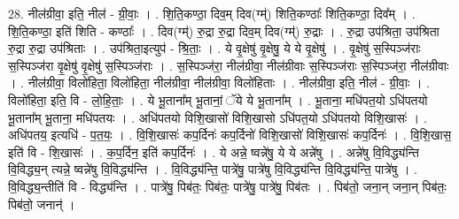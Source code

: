 \documentclass[17pt]{extarticle}
\begin{document}
28. नील॑ग्रीवा॒ इति॒ नील॑ - ग्री॒वाः॒ । . शि॒ति॒कण्ठा॒ दिव॒म् दिव(ग्म्॑) शिति॒कण्ठाः᳚ शिति॒कण्ठा॒ दिव᳚म् । . शि॒ति॒कण्ठा॒ इति॑ शिति - कण्ठाः᳚ । . दिव(ग्म्॑) रु॒द्रा रु॒द्रा दिव॒म् दिव(ग्म्॑) रु॒द्राः । . रु॒द्रा उप॑श्रिता॒ उप॑श्रिता रु॒द्रा रु॒द्रा उप॑श्रिताः । . उप॑श्रिता॒इत्युप॑ - श्रि॒ताः॒ । . ये वृ॒क्षेषु॑ वृ॒क्षेषु॒ ये ये वृ॒क्षेषु॑ । . वृ॒क्षेषु॑ स॒स्पिञ्ज॑राः स॒स्पिञ्ज॑रा वृ॒क्षेषु॑ वृ॒क्षेषु॑ स॒स्पिञ्ज॑राः । . स॒स्पिञ्ज॑रा॒ नील॑ग्रीवा॒ नील॑ग्रीवाः स॒स्पिञ्ज॑राः स॒स्पिञ्ज॑रा॒ नील॑ग्रीवाः । . नील॑ग्रीवा॒ विलो॑हिता॒ विलो॑हिता॒ नील॑ग्रीवा॒ नील॑ग्रीवा॒ विलो॑हिताः । . नील॑ग्रीवा॒ इति॒ नील॑ - ग्री॒वाः॒ । . विलो॑हिता॒ इति॒ वि - लो॒हि॒ताः॒ । . ये भू॒ताना᳚म् भू॒तानां॒ ॅये ये भू॒ताना᳚म् । . भू॒ताना॒ मधि॑पत॒यो ऽधि॑पतयो भू॒ताना᳚म् भू॒ताना॒ मधि॑पतयः । . अधि॑पतयो विशि॒खासो॑ विशि॒खासो ऽधि॑पत॒यो ऽधि॑पतयो विशि॒खासः॑ । . अधि॑पतय॒ इत्यधि॑ - प॒त॒यः॒ । . वि॒शि॒खासः॑ कप॒र्दिनः॑ कप॒र्दिनो॑ विशि॒खासो॑ विशि॒खासः॑ कप॒र्दिनः॑ । . वि॒शि॒खास॒ इति॑ वि - शि॒खासः॑ । . क॒प॒र्दिन॒ इति॑ कप॒र्दिनः॑ । . ये अन्ने॒ ष्वन्ने॑षु॒ ये ये अन्ने॑षु । . अन्ने॑षु वि॒विद्ध्य॑न्ति वि॒विद्ध्य॒न् त्यन्ने॒ ष्वन्ने॑षु वि॒विद्ध्य॑न्ति । . वि॒विद्ध्य॑न्ति॒ पात्रे॑षु॒ पात्रे॑षु वि॒विद्ध्य॑न्ति वि॒विद्ध्य॑न्ति॒ पात्रे॑षु । . वि॒विद्ध्य॒न्तीति॑ वि - विद्ध्य॑न्ति । . पात्रे॑षु॒ पिब॑तः॒ पिब॑तः॒ पात्रे॑षु॒ पात्रे॑षु॒ पिब॑तः । . पिब॑तो॒ जना॒न् जना॒न् पिब॑तः॒ पिब॑तो॒ जनान्॑ । \newline
\end{document}
